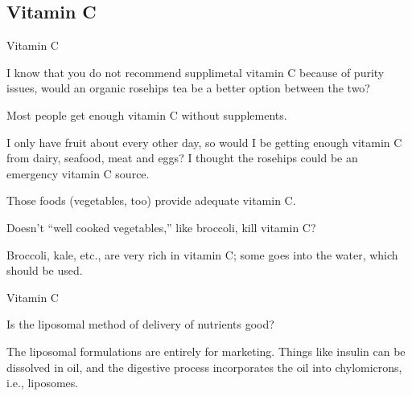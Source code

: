\documentclass[11pt,oneside,openany,extrafontsizes]{memoir}
\begin{document}
\subsection{Vitamin C}

\begin{emailexchange}{Vitamin C}

    \begin{question}
        I know that you do not recommend supplimetal vitamin C because of purity issues, would an organic rosehips tea be a better option between the two?
    \end{question}

    \begin{answer}
        Most people get enough vitamin C without supplements.
    \end{answer}

    \begin{question}
        I only have fruit about every other day, so would I be getting enough vitamin C from dairy, seafood, meat and eggs? I thought the rosehips could be an emergency vitamin C source.
    \end{question}

    \begin{answer}
        Those foods (vegetables, too) provide adequate vitamin C.
    \end{answer}

    \begin{question}
        Doesn't \enquote{well cooked vegetables,} like broccoli, kill vitamin C?
    \end{question}

    \begin{answer}
        Broccoli, kale, etc., are very rich in vitamin C; some goes into the water, which should be used.
    \end{answer}
\end{emailexchange}

\begin{qaexchange}{Vitamin C}

    \begin{question}
        Is the liposomal method of delivery of nutrients good?
    \end{question}

    \begin{answer}
        The liposomal formulations are entirely for marketing. Things like insulin can be dissolved in oil, and the digestive process incorporates the oil into chylomicrons, i.e., liposomes.
    \end{answer}
\end{qaexchange}
\end{document}
